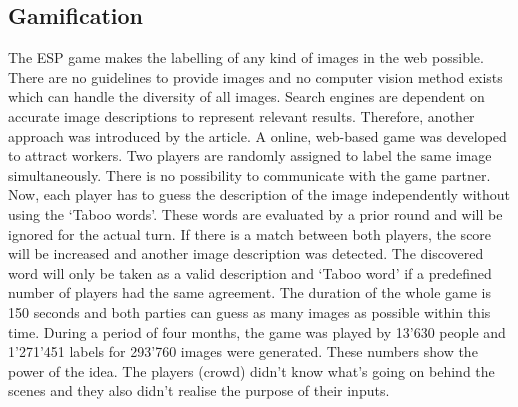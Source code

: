 \subsection{Gamification}
The ESP game\cite{esp} makes the labelling of any kind of images in the web possible. There are no guidelines to provide images and no computer vision method exists which can handle the diversity of all images. Search engines are dependent on accurate image descriptions to represent relevant results. Therefore, another approach was introduced by the article. A online, web-based game was developed to attract workers. Two players are randomly assigned to label the same image simultaneously. There is no possibility to communicate with the game partner. Now, each player has to guess the description of the image independently without using the `Taboo words'. These words are evaluated by a prior round and will be ignored for the actual turn. If there is a match between both players, the score will be increased and another image description was detected. The discovered word will only be taken as a valid description and `Taboo word' if a predefined number of players had the same agreement. The duration of the whole game is 150 seconds and both parties can guess as many images as possible within this time. 
During a period of four months, the game was played by 13'630 people and 1'271'451 labels for 293'760 images were generated. These numbers show the power of the idea. The players (crowd) didn't know what's going on behind the scenes and they also didn't realise the purpose of their inputs.

